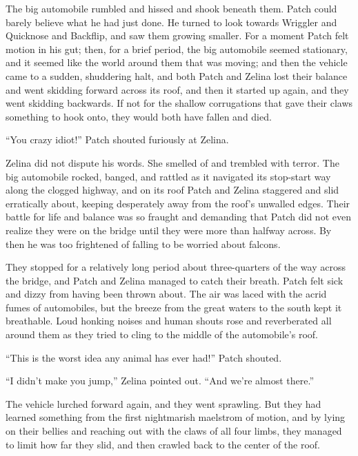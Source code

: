 \documentclass[ebook,oneside,openany,17pt]{memoir}
\newenvironment{tolerant}[1]{%
  \par\tolerance=#1\relax
}{%
  \par
}
\begin{document}
\begin{tolerant}{2000}
The big automobile rumbled and hissed and shook beneath them. Patch
could barely believe what he had just done. He turned to look towards
Wriggler and Quicknose and Backflip, and saw them growing smaller. For
a moment Patch felt motion in his gut; then, for a brief period, the
big automobile seemed stationary, and it seemed like the world around
them that was moving; and then the vehicle came to a sudden,
shuddering halt, and both Patch and Zelina lost their balance and went
skidding forward across its roof, and then it started up again, and
they went skidding backwards. If not for the shallow corrugations that
gave their claws something to hook onto, they would both have fallen
and died.
\end{tolerant}

“You crazy idiot!” Patch shouted furiously at Zelina.

Zelina did not dispute his words. She smelled of and trembled with
terror. The big automobile rocked, banged, and rattled as it navigated
its stop-start way along the clogged highway, and on its roof Patch
and Zelina staggered and slid erratically about, keeping desperately
away from the roof’s unwalled edges. Their battle for life and balance
was so fraught and demanding that Patch did not even realize they were
on the bridge until they were more than halfway across. By then he was
too frightened of falling to be worried about falcons.

\begin{tolerant}{1000}
They stopped for a relatively long period about three-quarters of the
way across the bridge, and Patch and Zelina managed to catch their
breath. Patch felt sick and dizzy from having been thrown about. The
air was laced with the acrid fumes of automobiles, but the breeze from
the great waters to the south kept it breathable. Loud honking noises
and human shouts rose and reverberated all around them as they tried
to cling to the middle of the automobile’s roof.
\end{tolerant}

“This is the worst idea any animal has ever had!” Patch shouted.

“I didn’t make you jump,” Zelina pointed out. “And we’re almost
there.”

The vehicle lurched forward again, and they went sprawling. But they
had learned something from the first nightmarish maelstrom of motion,
and by lying on their bellies and reaching out with the claws of all
four limbs, they managed to limit how far they slid, and then crawled
back to the center of the roof.
\end{document}
